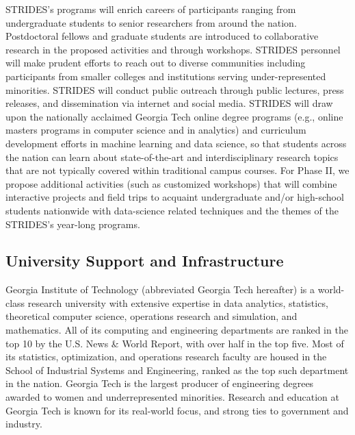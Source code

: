 \documentclass[12pt]{article}
\begin{document}
STRIDES's programs will enrich careers of participants ranging from undergraduate students to senior researchers from around the nation.
Postdoctoral fellows and graduate students are introduced to collaborative research in the proposed activities and through workshops.
STRIDES personnel will make prudent efforts to reach out to diverse communities including
participants from smaller colleges and institutions serving under-represented minorities.
STRIDES will conduct public outreach through public lectures, press releases, and dissemination via internet and social media.
STRIDES will draw upon the nationally acclaimed Georgia Tech online degree programs (e.g., online
masters programs in computer science and in analytics) and curriculum development efforts in
machine learning and data science, so that students across the nation can learn about state-of-the-art and interdisciplinary research topics that are not typically covered within traditional campus courses.
For Phase II, we propose additional activities (such as customized workshops) that will combine
interactive projects and field trips to acquaint undergraduate and/or high-school students
nationwide with data-science related techniques and the themes of the STRIDES's year-long programs.


\vspace*{-1em}
\subsection{University Support and Infrastructure}
Georgia Institute of Technology (abbreviated Georgia Tech hereafter) is a world-class research university with extensive expertise in data analytics, statistics, theoretical
computer science, operations research and simulation, and mathematics.
All of its computing and engineering departments are ranked in the top 10 by the
U.S. News \& World Report, with over half in the top five. Most of its statistics, optimization,
and operations research faculty are housed in the School of Industrial Systems and Engineering,
ranked as the top such department in the nation. Georgia Tech is the largest producer of engineering degrees awarded to women and underrepresented minorities. Research and education
at Georgia Tech is known for its real-world focus, and strong ties to government and industry.
\end{document}
